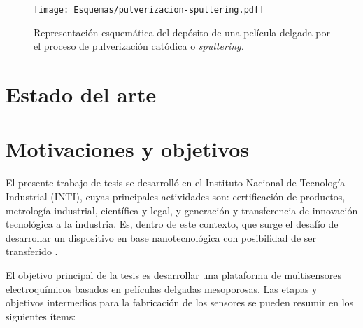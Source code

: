 				\begin{figure}[h!]
 				\begin{center}
 				\texttt{[image: Esquemas/pulverizacion-sputtering.pdf]}
 				\caption[Etapas del proceso de pulverización catódica]{Representación esquemática del depósito de una película delgada por el proceso de pulverización catódica o \textit{sputtering.}}
 		   		\label{fig:sssspputt}
 		    	\end{center}
 		    	\end{figure}			

\section{Estado del arte}

	 		    	
 		    	
\section{Motivaciones y objetivos}

	El presente trabajo de tesis se desarrolló en el Instituto Nacional de Tecnología Industrial (INTI), cuyas principales actividades son: certificación de productos, metrología industrial, científica y legal, y generación y transferencia	de innovación tecnológica a la industria. Es, dentro de este contexto, que surge el desafío de desarrollar un dispositivo en base nanotecnológica con posibilidad de ser transferido . 

	El objetivo principal de la tesis es desarrollar una plataforma de multisensores electroquímicos basados en películas delgadas mesoporosas. Las etapas y objetivos intermedios para la fabricación de los sensores se pueden resumir en los siguientes ítems:

